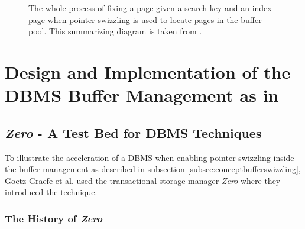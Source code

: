 \begin{@empty}
\begin{figure}[ht!]
{
		}
        \vspace{.5em}
		\caption{The whole process of fixing a page given a search key and an index page when pointer swizzling is used to locate pages in the buffer pool. This summarizing diagram is taken from \cite{Graefe:2014}.}
		\label{fig:locateswizzle}
	\end{figure}
\end{@empty}
	
\section[Design and Implementation of the Buffer Manager]{Design and Implementation of the DBMS Buffer Management as in \cite{Graefe:2014}}

\subsection[\emph{Zero} - The Test Bed]{\emph{Zero} - A Test Bed for DBMS Techniques}

	To illustrate the acceleration of a DBMS when enabling pointer swizzling inside the buffer management as described in subsection \ref{subsec:conceptbufferswizzling}, Goetz Graefe et al. used the transactional storage manager \emph{Zero} where they introduced the technique.
	
\subsubsection[History of \emph{Zero}]{The History of \emph{Zero}}
	

